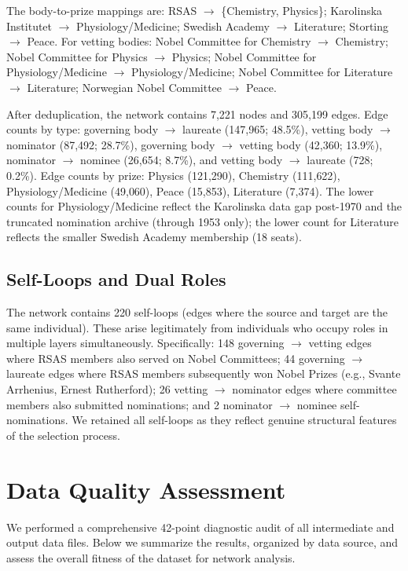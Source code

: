 The body-to-prize mappings are: RSAS $\to$ \{Chemistry, Physics\};
Karolinska Institutet $\to$ Physiology/Medicine; Swedish Academy $\to$
Literature; Storting $\to$ Peace. For vetting bodies: Nobel Committee for
Chemistry $\to$ Chemistry; Nobel Committee for Physics $\to$ Physics; Nobel
Committee for Physiology/Medicine $\to$ Physiology/Medicine; Nobel Committee
for Literature $\to$ Literature; Norwegian Nobel Committee $\to$ Peace.

After deduplication, the network contains 7{,}221 nodes and 305{,}199
edges. Edge counts by type: governing body $\to$ laureate (147{,}965;
48.5\%), vetting body $\to$ nominator (87{,}492; 28.7\%), governing body
$\to$ vetting body (42{,}360; 13.9\%), nominator $\to$ nominee (26{,}654;
8.7\%), and vetting body $\to$ laureate (728; 0.2\%). Edge counts by prize:
Physics (121{,}290), Chemistry (111{,}622), Physiology/Medicine (49{,}060),
Peace (15{,}853), Literature (7{,}374). The lower counts for
Physiology/Medicine reflect the Karolinska data gap post-1970 and the
truncated nomination archive (through 1953 only); the lower count for
Literature reflects the smaller Swedish Academy membership (18 seats).

\subsection{Self-Loops and Dual Roles}\label{sec:selfloops}

The network contains 220 self-loops (edges where the source and target
are the same individual). These arise legitimately from individuals who
occupy roles in multiple layers simultaneously. Specifically: 148
governing $\to$ vetting edges where RSAS members also served on Nobel
Committees; 44 governing $\to$ laureate edges where RSAS members
subsequently won Nobel Prizes (e.g., Svante Arrhenius, Ernest Rutherford);
26 vetting $\to$ nominator edges where committee members also submitted
nominations; and 2 nominator $\to$ nominee self-nominations. We retained
all self-loops as they reflect genuine structural features of the
selection process.

\section{Data Quality Assessment}\label{sec:diagnostics}

We performed a comprehensive 42-point diagnostic audit of all intermediate
and output data files. Below we summarize the results, organized by data
source, and assess the overall fitness of the dataset for network analysis.

